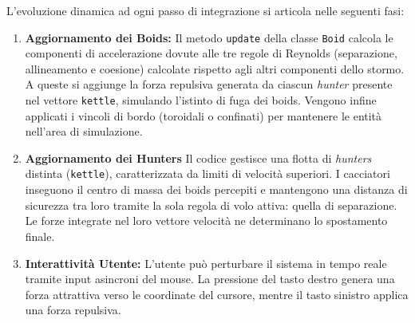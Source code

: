 \documentclass[11pt, a4paper]{article}
\begin{document}
L'evoluzione dinamica ad ogni passo di integrazione si articola nelle seguenti fasi:
\begin{enumerate}
    \item \textbf{Aggiornamento dei Boids:} Il metodo \texttt{update} della classe \texttt{Boid} calcola le componenti di accelerazione dovute alle tre regole di Reynolds (separazione, allineamento e coesione) calcolate rispetto agli altri componenti dello stormo. A queste si aggiunge la forza repulsiva generata da ciascun \textit{hunter} presente nel vettore \texttt{kettle}, simulando l'istinto di fuga dei boids. Vengono infine applicati i vincoli di bordo (toroidali o confinati) per mantenere le entità nell'area di simulazione.
    \item \textbf{Aggiornamento dei Hunters} Il codice gestisce una flotta di \textit{hunters} distinta (\texttt{kettle}), caratterizzata da limiti di velocità superiori. I cacciatori inseguono il centro di massa dei boids percepiti e mantengono una distanza di sicurezza tra loro tramite la sola regola di volo attiva: quella di separazione. Le forze integrate nel loro vettore velocità ne determinano lo spostamento finale.
    \item \textbf{Interattività Utente:} L'utente può perturbare il sistema in tempo reale tramite input asincroni del mouse. La pressione del tasto destro genera una forza attrattiva verso le coordinate del cursore, mentre il tasto sinistro applica una forza repulsiva.
\end{enumerate}
\end{document}

